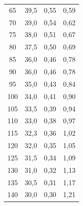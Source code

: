 \documentclass{article}
\begin{document}
\begin{tabular}{cccc}
	65             & 39,5                         & 0,55                                                                 & 0,59     \\
	70             & 39,0                         & 0,54                                                                 & 0,62     \\
	75             & 38,0                         & 0,51                                                                 & 0,67     \\
	80             & 37,5                         & 0,50                                                                 & 0,69     \\
	85             & 36,0                         & 0,46                                                                 & 0,78     \\
	90             & 36,0                         & 0,46                                                                 & 0,78     \\
	95             & 35,0                         & 0,43                                                                 & 0,84     \\
	100            & 34,0                         & 0,41                                                                 & 0,90     \\
	105            & 33,5                         & 0,39                                                                 & 0,94     \\
	110            & 33,0                         & 0,38                                                                 & 0,97     \\
	115            & 32,3                         & 0,36                                                                 & 1,02     \\
	120            & 32,0                         & 0,35                                                                 & 1,05     \\
	125            & 31,5                         & 0,34                                                                 & 1,09     \\
	130            & 31,0                         & 0,32                                                                 & 1,13     \\
	135            & 30,5                         & 0,31                                                                 & 1,17     \\
	140            & 30,0                         & 0,30                                                                 & 1,21     \\

\end{tabular}
\end{document}
